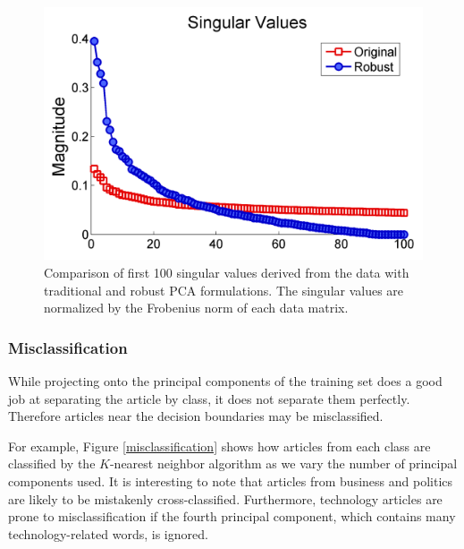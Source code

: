 \documentclass[12pt]{article}
\begin{document}
\begin{figure}[H]
\centering
\includegraphics[width=.6\textwidth]{figures/singularvaluescompare}
\caption{Comparison of first 100 singular values derived from the data with traditional and robust PCA formulations. The singular values are normalized by the Frobenius norm of each data matrix. }
\label{sing_val}
\end{figure}


\subsubsection{Misclassification}
While projecting onto the principal components of the training set does a good job at separating the article by class, it does
not separate them perfectly. Therefore articles near the decision boundaries may be misclassified.

For example, Figure \ref{misclassification} shows how articles from each class are classified by the $K$-nearest neighbor algorithm as we vary the number of principal components used. It is interesting to note that articles from business and politics are likely to be mistakenly cross-classified. Furthermore, technology articles are prone to misclassification if the fourth principal component, which contains many technology-related words, is ignored.
\end{document}
